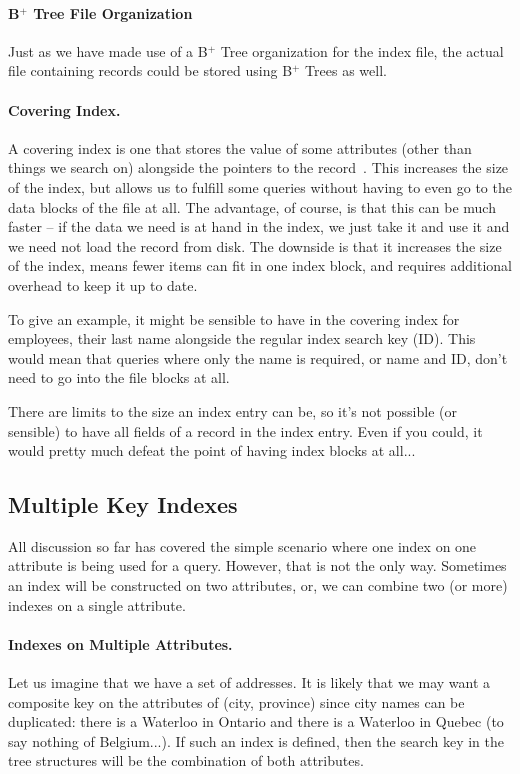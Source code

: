 \paragraph{B$^{+}$ Tree File Organization} 
Just as we have made use of a B$^{+}$ Tree organization for the index file, the actual file containing records could be stored using B$^{+}$ Trees as well.

\paragraph{Covering Index.} 
A covering index is one that stores the value of some attributes (other than things we search on) alongside the pointers to the record~\cite{dsc}. This increases the size of the index, but allows us to fulfill some queries without having to even go to the data blocks of the file at all. The advantage, of course, is that this can be much faster -- if the data we need is at hand in the index, we just take it and use it and we need not load the record from disk. The downside is that it increases the size of the index, means fewer items can fit in one index block, and requires additional overhead to keep it up to date.

To give an example, it might be sensible to have in the covering index for employees, their last name alongside the regular index search key (ID). This would mean that queries where only the name is required, or name and ID, don't need to go into the file blocks at all.

There are limits to the size an index entry can be, so it's not possible (or sensible) to have all fields of a record in the index entry. Even if you could, it would pretty much defeat the point of having index blocks at all...

\subsection*{Multiple Key Indexes}

All discussion so far has covered the simple scenario where one index on one attribute is being used for a query. However, that is not the only way. Sometimes an index will be constructed on two attributes, or, we can combine two (or more) indexes on a single attribute. 

\paragraph{Indexes on Multiple Attributes.} Let us imagine that we have a set of addresses. It is likely that we may want a composite key on the attributes of (city, province) since city names can be duplicated: there is a Waterloo in Ontario and there is a Waterloo in Quebec (to say nothing of Belgium...). If such an index is defined, then the search key in the tree structures will be the combination of both attributes. 

